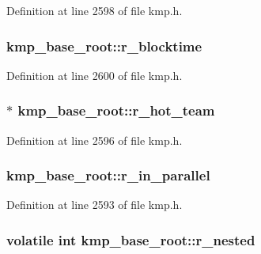 Definition at line 2598 of file kmp.\-h.

\hypertarget{structkmp__base__root_a93210c748ab8706cb885b5480642900c}{
\subsubsection[{r\-\_\-blocktime}]{ kmp\-\_\-base\-\_\-root\-::r\-\_\-blocktime}}\label{structkmp__base__root_a93210c748ab8706cb885b5480642900c}


Definition at line 2600 of file kmp.\-h.

\hypertarget{structkmp__base__root_a1d20484cd0e671de0c461c437a2f0d5c}{
\subsubsection[{r\-\_\-hot\-\_\-team}]{$\ast$ kmp\-\_\-base\-\_\-root\-::r\-\_\-hot\-\_\-team}}\label{structkmp__base__root_a1d20484cd0e671de0c461c437a2f0d5c}


Definition at line 2596 of file kmp.\-h.

\hypertarget{structkmp__base__root_ac92ed0f51c2cde642c6f08776593d157}{
\subsubsection[{r\-\_\-in\-\_\-parallel}]{ kmp\-\_\-base\-\_\-root\-::r\-\_\-in\-\_\-parallel}}\label{structkmp__base__root_ac92ed0f51c2cde642c6f08776593d157}


Definition at line 2593 of file kmp.\-h.

\hypertarget{structkmp__base__root_ab4917588eeaf55157ecf8296c364d016}{
\subsubsection[{r\-\_\-nested}]{\setlength{\rightskip}{0pt plus 5cm}volatile {\bf int} kmp\-\_\-base\-\_\-root\-::r\-\_\-nested}}\label{structkmp__base__root_ab4917588eeaf55157ecf8296c364d016}


